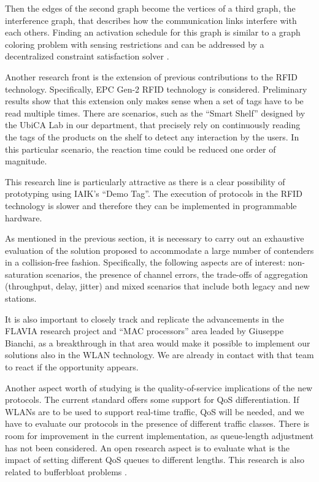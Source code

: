 \documentclass[a4paper,twocolumns]{article}%
\begin{document}
Then the edges of the second graph become the vertices of a third graph, the interference graph, that describes how the communication links interfere with each others.
Finding an activation schedule for this graph is similar to a graph coloring problem with sensing restrictions \cite{checco2012lbc} and can be addressed by a decentralized constraint satisfaction solver \cite{duffy2011dcs}.

Another research front is the extension of previous contributions to the RFID technology.
Specifically, EPC Gen-2 RFID technology is considered.
Preliminary results show that this extension only makes sense when a set of tags have to be read multiple times.
There are scenarios, such as the ``Smart Shelf'' designed by the UbiCA Lab in our department, that precisely rely on continuously reading the tags of the products on the shelf to detect any interaction by the users.
In this particular scenario, the reaction time could be reduced one order of magnitude.

This research line is particularly attractive as there is a clear possibility of prototyping using IAIK's ``Demo Tag''.
The execution of protocols in the RFID technology is slower and therefore they can be implemented in programmable hardware.

As mentioned in the previous section, it is necessary to carry out an exhaustive evaluation of the solution proposed to accommodate a large number of contenders in a collision-free fashion.
Specifically, the following aspects are of interest: non-saturation scenarios, the presence of channel errors, the trade-offs of aggregation (throughput, delay, jitter) and mixed scenarios that include both legacy and new stations.

It is also important to closely track and replicate the advancements in the FLAVIA research project and ``MAC processors'' area leaded by Giuseppe Bianchi, as a breakthrough in that area would make it possible to implement our solutions also in the WLAN technology.
We are already in contact with that team to react if the opportunity appears.

Another aspect worth of studying is the quality-of-service implications of the new protocols.
The current standard offers some support for QoS differentiation.
If WLANs are to be used to support real-time traffic, QoS will be needed, and we have to evaluate our protocols in the presence of different traffic classes.
There is room for improvement in the current implementation, as queue-length adjustment has not been considered.
An open research aspect is to evaluate what is the impact of setting different QoS queues to different lengths.
This research is also related to bufferbloat problems \cite{nichols2012cqd}.
\end{document}
